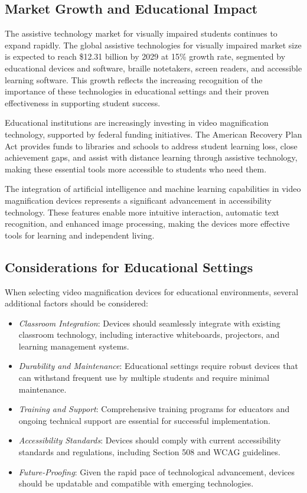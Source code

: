 \subsection{Market Growth and Educational Impact}

The assistive technology market for visually impaired students continues to expand rapidly. The global assistive technologies for visually impaired market size is expected to reach \$12.31 billion by 2029 at 15\% growth rate, segmented by educational devices and software, braille notetakers, screen readers, and accessible learning software. This growth reflects the increasing recognition of the importance of these technologies in educational settings and their proven effectiveness in supporting student success.

Educational institutions are increasingly investing in video magnification technology, supported by federal funding initiatives. The American Recovery Plan Act provides funds to libraries and schools to address student learning loss, close achievement gaps, and assist with distance learning through assistive technology, making these essential tools more accessible to students who need them.

The integration of artificial intelligence and machine learning capabilities in video magnification devices represents a significant advancement in accessibility technology. These features enable more intuitive interaction, automatic text recognition, and enhanced image processing, making the devices more effective tools for learning and independent living.

\subsection{Considerations for Educational Settings}

When selecting video magnification devices for educational environments, several additional factors should be considered:

\begin{itemize}
 \item \emph{Classroom Integration}: Devices should seamlessly integrate with existing classroom technology, including interactive whiteboards, projectors, and learning management systems.
 \item \emph{Durability and Maintenance}: Educational settings require robust devices that can withstand frequent use by multiple students and require minimal maintenance.
 \item \emph{Training and Support}: Comprehensive training programs for educators and ongoing technical support are essential for successful implementation.
 \item \emph{Accessibility Standards}: Devices should comply with current accessibility standards and regulations, including Section 508 and WCAG guidelines.
 \item \emph{Future-Proofing}: Given the rapid pace of technological advancement, devices should be updatable and compatible with emerging technologies.
\end{itemize}

